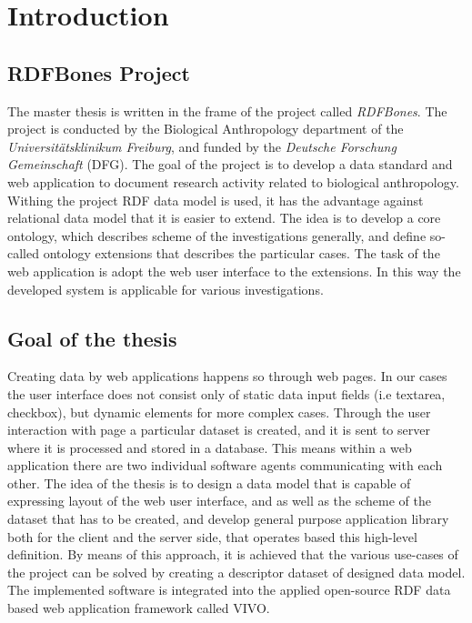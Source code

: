 \chapter{Introduction}


\section{RDFBones Project}

The master thesis is written in the frame of the project called \textit{RDFBones}. The project is conducted by the Biological Anthropology department of the \textit{Universitätsklinikum Freiburg}, and funded by the \textit{Deutsche Forschung Gemeinschaft} (DFG). 
The goal of the project is to develop a data standard and web application to document research activity related to biological anthropology. Withing the project RDF data model is used, it has the advantage against relational data model that it is easier to extend. The idea is to develop a core ontology, which describes scheme of the investigations generally, and define so-called ontology extensions that describes the particular cases. The task of the web application is adopt the web user interface to the extensions. In this way the developed system is applicable for various investigations. \cite{infrastructure}

\section{Goal of the thesis}

Creating data by web applications happens so through web pages. In our cases the user interface does not consist only of static data input fields (i.e textarea, checkbox), but dynamic elements for more complex cases. Through the user interaction with page a particular dataset is created, and it is sent to server where it is processed and stored in a database. This means within a web application there are two individual software agents communicating with each other. The idea of the thesis is to design a data model that is capable of expressing layout of the web user interface, and as well as the scheme of the dataset that has to be created, and develop general purpose application library both for the client and the server side, that operates based this high-level definition. By means of this approach, it is achieved that the various use-cases of the project can be solved by creating a descriptor dataset of designed data model. The implemented software is integrated into the applied open-source RDF data based web application framework called VIVO.

